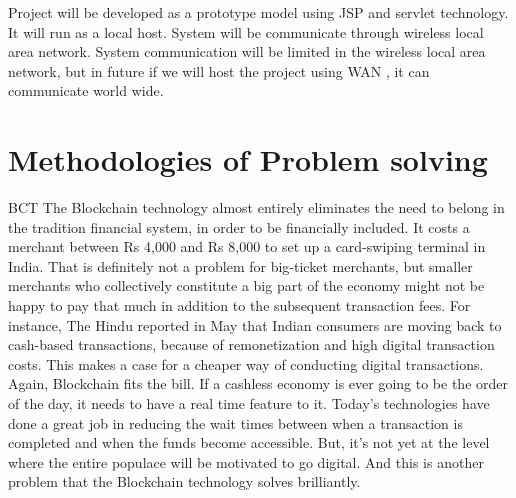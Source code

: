 \documentclass[oneside,a4paper,12pt]{report}
\begin{document}
Project will be developed as a prototype model using JSP and servlet technology. It will run as a local host. System will be communicate through wireless local area network. System communication will be limited in the wireless local area network, but in future if we will host the project using WAN , it can communicate world wide. 
\section{Methodologies of Problem solving}
BCT 
The Blockchain technology almost entirely eliminates the need to belong in the tradition financial system, in order to be financially included. It costs a merchant between Rs 4,000  and Rs 8,000  to set up a card-swiping terminal in India. That is definitely not a problem for big-ticket merchants, but smaller merchants who collectively constitute a big part of the economy might not be happy to pay that much in addition to the subsequent transaction fees. For instance, The Hindu reported in May that Indian consumers are moving back to cash-based transactions, because of remonetization and high digital transaction costs. This makes a case for a cheaper way of conducting digital transactions. Again, Blockchain fits the bill. If a cashless economy is ever going to be the order of the day, it needs to have a real time feature to it. Today’s technologies have done a great job in reducing the wait times between when a transaction is completed and when the funds become accessible. But, it’s not yet at the level where the entire populace will be motivated to go digital. And this is another problem that the Blockchain technology solves brilliantly.
\end{document}
